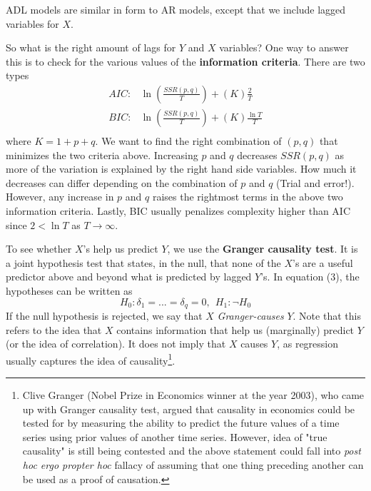 \documentclass[12pt]{article}
\theoremstyle{definition}
\theoremstyle{property}
\theoremstyle{assumption}
\theoremstyle{example}
\theoremstyle{comment}
\begin{document}
ADL models are similar in form to AR models, except that we include lagged variables for $X$.
\par\medskip
So what is the right amount of lags for $Y$ and $X$ variables? One way to answer this is to check for the various values of the \textbf{information criteria}. There are two types
\[
\begin{aligned}
AIC:& \ln\left(\frac{SSR(p,q)}{T}\right)+(K)\frac{2}{T}\\
BIC:& \ln\left(\frac{SSR(p,q)}{T}\right)+(K)\frac{\ln{T}}{T}\\
\end{aligned}
\]
where $K=1+p+q$. We want to find the right combination of $(p,q)$ that minimizes the two criteria above. Increasing $p$ and $q$ decreases $SSR(p,q)$ as more of the variation is explained by the right hand side variables. How much it decreases can differ depending on the combination of $p$ and $q$ (Trial and error!). However, any increase in $p$ and $q$ raises the rightmost terms in the above two information criteria. Lastly, BIC usually penalizes complexity higher than AIC since $2<\ln{T}$ as $T\to\infty$. 
\par\medskip
To see whether $X$'s help us predict $Y$, we use the \textbf{Granger causality test}. It is a joint hypothesis test that states, in the null, that none of the $X$'s are a useful predictor above and beyond what is predicted by lagged $Y$'s. In equation (3), the hypotheses can be written as
\[
H_0: \delta_1 = ... = \delta_q=0, \ \ H_1: \lnot H_0
\]
If the null hypothesis is rejected, we say that $X$ \textit{Granger-causes} $Y$. Note that this refers to the idea that $X$ contains information that help us (marginally) predict $Y$ (or the idea of correlation). It does not imply that $X$ causes $Y$, as regression usually captures the idea of causality\footnote{Clive Granger (Nobel Prize in Economics winner at the year 2003), who came up with Granger causality test, argued that causality in economics could be tested for by measuring the ability to predict the future values of a time series using prior values of another time series. However, idea of "true causality" is still being contested and the above statement could fall into  \textit{post hoc ergo propter hoc} fallacy of assuming that one thing preceding another can be used as a proof of causation.  }. 
\end{document}
